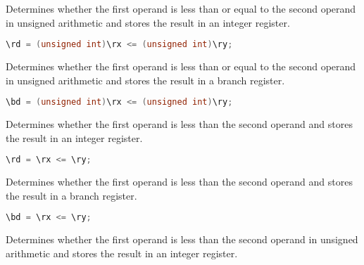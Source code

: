 Determines whether the first operand is less than or equal to the second
operand in unsigned arithmetic and stores the result in an integer register.

\begin{lstlisting}[numbers=none, basicstyle=\ttfamily\footnotesize, language=C++]
\rd = (unsigned int)\rx <= (unsigned int)\ry;
\end{lstlisting}

Determines whether the first operand is less than or equal to the second
operand in unsigned arithmetic and stores the result in a branch register.

\begin{lstlisting}[numbers=none, basicstyle=\ttfamily\footnotesize, language=C++]
\bd = (unsigned int)\rx <= (unsigned int)\ry;
\end{lstlisting}

Determines whether the first operand is less than the second operand and stores
the result in an integer register.

\begin{lstlisting}[numbers=none, basicstyle=\ttfamily\footnotesize, language=C++]
\rd = \rx <= \ry;
\end{lstlisting}

Determines whether the first operand is less than the second operand and stores
the result in a branch register.

\begin{lstlisting}[numbers=none, basicstyle=\ttfamily\footnotesize, language=C++]
\bd = \rx <= \ry;
\end{lstlisting}

Determines whether the first operand is less than the second operand in unsigned
arithmetic and stores the result in an integer register.

